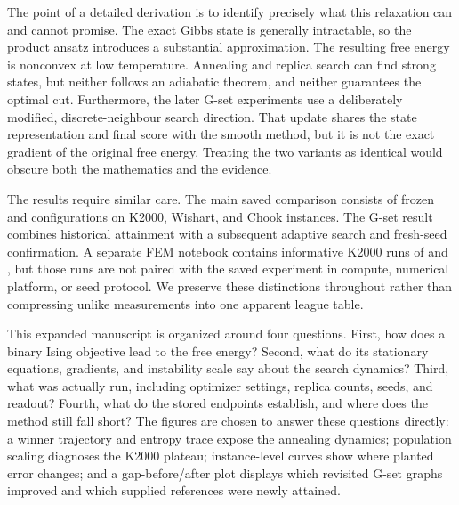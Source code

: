 The point of a detailed derivation is to identify precisely what this
relaxation can and cannot promise. The exact Gibbs state is generally
intractable, so the product ansatz introduces a substantial approximation.
The resulting free energy is nonconvex at low temperature. Annealing and
replica search can find strong states, but neither follows an adiabatic
theorem, and neither guarantees the optimal cut. Furthermore, the later
G-set experiments use a deliberately modified, discrete-neighbour search
direction. That update shares the state representation and final score with
the smooth method, but it is not the exact gradient of the original free
energy. Treating the two variants as identical would obscure both the
mathematics and the evidence.

The results require similar care. The main saved comparison consists of
frozen \QeFEM{} and \LQA{} configurations on K2000, Wishart, and Chook
instances. The G-set result combines historical attainment with a subsequent
adaptive search and fresh-seed confirmation. A separate FEM notebook
contains informative K2000 runs of \FEM{} and \dSB, but those runs are not
paired with the saved \QeFEM{} experiment in compute, numerical platform,
or seed protocol. We preserve these distinctions throughout rather than
compressing unlike measurements into one apparent league table.

This expanded manuscript is organized around four questions. First, how
does a binary Ising objective lead to the \QeFEM{} free energy? Second, what
do its stationary equations, gradients, and instability scale say about the
search dynamics? Third, what was actually run, including optimizer settings,
replica counts, seeds, and readout? Fourth, what do the stored endpoints
establish, and where does the method still fall short? The figures are
chosen to answer these questions directly: a winner trajectory and entropy
trace expose the annealing dynamics; population scaling diagnoses the K2000
plateau; instance-level curves show where planted error changes; and a
gap-before/after plot displays which revisited G-set graphs improved and
which supplied references were newly attained.
